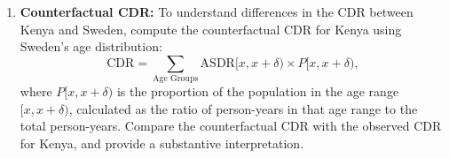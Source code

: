 \documentclass[12pt]{article}
\begin{document}
\begin{enumerate}
    \item \textbf{Counterfactual CDR:} To understand differences in the CDR between Kenya and Sweden, compute the counterfactual CDR for Kenya using Sweden’s age distribution:
    \[
    \text{CDR} = \sum_{\text{Age Groups}} \text{ASDR}[x, x+\delta) \times P[x, x+\delta),
    \]
    where $P[x, x+\delta)$ is the proportion of the population in the age range $[x, x+\delta)$, calculated as the ratio of person-years in that age range to the total person-years. Compare the counterfactual CDR with the observed CDR for Kenya, and provide a substantive interpretation.
\end{enumerate}
\end{document}
